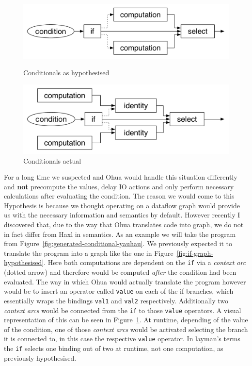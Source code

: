 \begin{figure}
  \includegraphics[width=\textwidth]{../Figures/if-hypothesised}
  \caption{Conditionals as hypothesised}
  \label{fig:if-graph-hypothesised}
  \includegraphics[width=\textwidth]{../Figures/if-in-reality}
  \caption{Conditionals actual}
  \label{fig:if-graph-actual}
\end{figure}

For a long time we suspected \yauhau{} and Ohua would handle this situation differently and \textbf{not} precompute the values, delay IO actions and only perform necessary calculations after evaluating the condition.
The reason we would come to this Hypothesis is because we thought operating on a dataflow graph would provide us with the necessary information and semantics by default.
However recently I discovered that, due to the way that Ohua translates code into graph, we do not in fact differ from Haxl in semantics.
As an example we will take the program from Figure~\ref{fig:generated-conditional-yauhau}.
We previously expected it to translate the program into a graph like the one in Figure~\ref{fig:if-graph-hypothesised}.
Here both computations are dependent on the \texttt{if} via a \textit{context arc} (dotted arrow) and therefore would be computed \textit{after} the condition had been evaluated.
The way in which Ohua would actually translate the program however would be to insert an operator called \texttt{value} on each of the if branches, which essentially wraps the bindings \texttt{val1} and \texttt{val2} respectively.
Additionally two \textit{context arcs} would be connected from the \texttt{if} to those \texttt{value} operators.
A visual representation of this can be seen in Figure~\ref{fig:if-graph-actual}.
At runtime, depending of the value of the condition, one of those \textit{context arcs} would be activated selecting the branch it is connected to, in this case the respective \texttt{value} operator.
In layman's terms the \texttt{if} selects one binding out of two at runtime, not one computation, as previously hypothesised.

